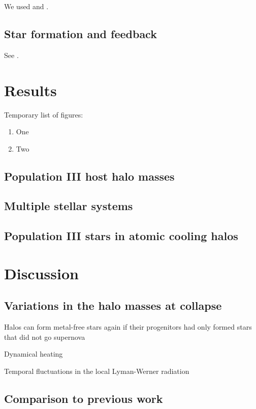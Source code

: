 \documentclass[a4paper,fleqn,usenatbib]{mnras}
\begin{document}
We used \enzo{} \citep{Enzo} and \yt{} \citep{yt_full_paper}.

\subsection{Star formation and feedback}

See \citet{Wise14}.

\section{Results}

Temporary list of figures:
\begin{enumerate}
\item One
\item Two
\end{enumerate}

\subsection{Population III host halo masses}

\subsection{Multiple stellar systems}

\subsection{Population III stars in atomic cooling halos}

\section{Discussion}

\subsection{Variations in the halo masses at collapse}

\li Halos can form metal-free stars again if their progenitors had
only formed stars that did not go supernova

\li Dynamical heating \citep{Yoshida03}

\li Temporal fluctuations in the local Lyman-Werner radiation

\subsection{Comparison to previous work}
\end{document}
